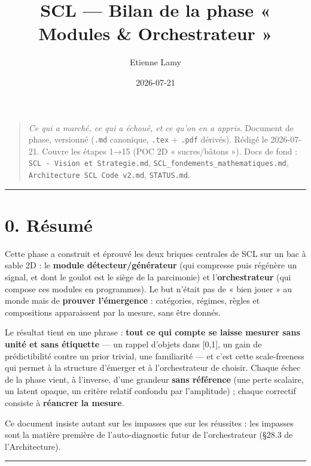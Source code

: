 \documentclass[
  french,
  11pt,
]{article}
\title{SCL --- Bilan de la phase « Modules \& Orchestrateur »}
\author{Etienne Lamy}
\date{2026-07-21}
\begin{document}
\maketitle

{
\hypersetup{linkcolor=black}
\setcounter{tocdepth}{2}
\tableofcontents
}
\begin{quote}
\emph{Ce qui a marché, ce qui a échoué, et ce qu'on en a appris.}
Document de phase, versionné (\texttt{.md} canonique, \texttt{.tex} +
\texttt{.pdf} dérivés). Rédigé le 2026-07-21. Couvre les étapes 1→15
(POC 2D « sucres/bâtons »). Docs de fond :
\texttt{SCL\ -\ Vision\ et\ Strategie.md},
\texttt{SCL\_fondements\_mathematiques.md},
\texttt{Architecture\ SCL\ Code\ v2.md}, \texttt{STATUS.md}.
\end{quote}

\begin{center}\rule{0.5\linewidth}{0.5pt}\end{center}

\section{0. Résumé}\label{ruxe9sumuxe9}

Cette phase a construit et éprouvé les deux briques centrales de SCL sur
un bac à sable 2D : le \textbf{module détecteur/générateur} (qui
compresse puis régénère un signal, et dont le goulot est le siège de la
parcimonie) et l'\textbf{orchestrateur} (qui compose ces modules en
programmes). Le but n'était pas de « bien jouer » au monde mais de
\textbf{prouver l'émergence} : catégories, régimes, règles et
compositions apparaissent par la mesure, sans être donnés.

Le résultat tient en une phrase : \textbf{tout ce qui compte se laisse
mesurer sans unité et sans étiquette} --- un rappel d'objets dans
{[}0,1{]}, un gain de prédictibilité contre un prior trivial, une
familiarité --- et c'est cette scale-freeness qui permet à la structure
d'émerger et à l'orchestrateur de choisir. Chaque échec de la phase
vient, à l'inverse, d'une grandeur \textbf{sans référence} (une perte
scalaire, un latent opaque, un critère relatif confondu par l'amplitude)
; chaque correctif consiste à \textbf{réancrer la mesure}.

Ce document insiste autant sur les impasses que sur les réussites : les
impasses sont la matière première de l'auto-diagnostic futur de
l'orchestrateur (§28.3 de l'Architecture).

\begin{center}\rule{0.5\linewidth}{0.5pt}\end{center}
\end{document}
